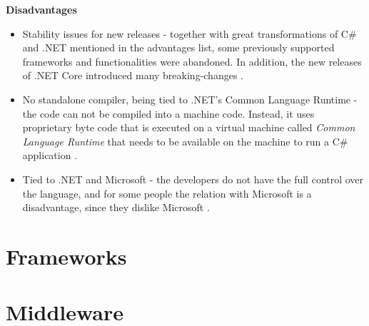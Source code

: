 \textbf{Disadvantages}
\begin{itemize}
    \item Stability issues for new releases - together with great transformations of C\# and .NET mentioned in the advantages list, some previously supported frameworks and functionalities were abandoned. In addition, the new releases of .NET Core introduced many breaking-changes \cite{net-breaking-changes}. 
    \item No standalone compiler, being tied to .NET's Common Language Runtime - the code can not be compiled into a machine code. Instead, it uses proprietary byte code that is executed on a virtual machine called \textit{Common Language Runtime} that needs to be available on the machine to run a C\# application \cite{c-sharp-tour}.
    \item Tied to .NET and Microsoft - the developers do not have the full control over the language, and for some people the relation with Microsoft is a disadvantage, since they dislike Microsoft .
\end{itemize}

\section{Frameworks}

\section{Middleware}
